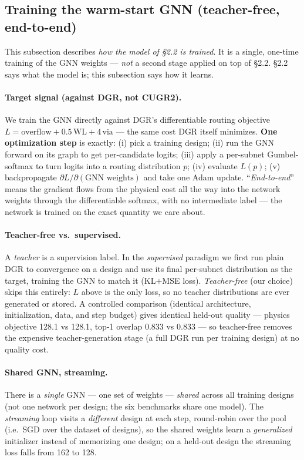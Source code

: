 \documentclass[11pt]{article}
\begin{document}
\subsection{Training the warm-start GNN (teacher-free, end-to-end)}
\label{sec:training-gnn}
This subsection describes \emph{how the model of \S2.2 is trained}. It is a
single, one-time training of the GNN weights --- \emph{not} a second stage
applied on top of \S2.2. \S2.2 says what the model is; this subsection says
how it learns.

\paragraph{Target signal (against DGR, not CUGR2).} We train the GNN directly
against DGR's differentiable routing objective
$L=\text{overflow}+0.5\,\text{WL}+4\,\text{via}$ --- the same cost DGR itself
minimizes. \textbf{One optimization step} is exactly: (i) pick a training
design; (ii) run the GNN forward on its graph to get per-candidate logits;
(iii) apply a per-subnet Gumbel-softmax to turn logits into a routing
distribution $p$; (iv) evaluate $L(p)$; (v) backpropagate
$\partial L/\partial(\text{GNN weights})$ and take one Adam update.
``\emph{End-to-end}'' means the gradient flows from the physical cost all the
way into the network weights through the differentiable softmax, with no
intermediate label --- the network is trained on the exact quantity we care
about.

\paragraph{Teacher-free vs.\ supervised.} A \emph{teacher} is a supervision
label. In the \emph{supervised} paradigm we first run plain DGR to
convergence on a design and use its final per-subnet distribution as the
target, training the GNN to match it (KL$+$MSE loss). \emph{Teacher-free}
(our choice) skips this entirely: $L$ above is the only loss, so no teacher
distributions are ever generated or stored. A controlled comparison
(identical architecture, initialization, data, and step budget) gives
identical held-out quality --- physics objective 128.1 vs 128.1, top-1
overlap 0.833 vs 0.833 --- so teacher-free removes the expensive
teacher-generation stage (a full DGR run per training design) at no quality
cost.

\paragraph{Shared GNN, streaming.} There is a \emph{single} GNN --- one set of
weights --- \emph{shared} across all training designs (not one network per
design; the six benchmarks share one model). The \emph{streaming} loop visits
a \emph{different} design at each step, round-robin over the pool (i.e.\ SGD
over the dataset of designs), so the shared weights learn a \emph{generalized}
initializer instead of memorizing one design; on a held-out design the
streaming loss falls from 162 to 128.
\end{document}
